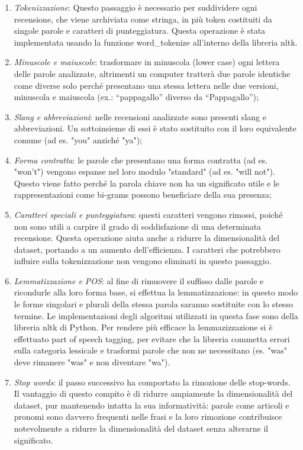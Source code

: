 \documentclass[fleqn,10pt]{SelfArx} %
\begin{document}
\begin{enumerate}
\item \textit{Tokenizzazione}: Questo passaggio è necessario per suddividere ogni recensione, che viene archiviata come stringa, in più token costituiti da singole parole e caratteri di punteggiatura. Questa operazione è stata implementata usando la funzione word\_tokenize all'interno della libreria nltk.

\item \textit{Minuscole e maiuscole}: trasformare in minuscola (lower case) ogni lettera delle parole analizzate, altrimenti un computer tratterà due parole identiche come diverse solo perché presentano una stessa lettera nelle due versioni, minuscola e maiuscola (ex.: “pappagallo” diverso da “Pappagallo”);

\item \textit{Slang e abbreviazioni}: nelle recensioni analizzate sono presenti slang e abbreviazioni. Un sottoinsieme di essi è stato sostituito con il loro equivalente comune (ad es. "you" anziché "ya");

\item \textit{Forma contratta}: le parole che presentano una forma contratta (ad es. "won’t") vengono espanse nel loro modulo "standard" (ad es. "will not"). Questo viene fatto perché la parola chiave non ha un significato utile e le rappresentazioni come bi-grams possono beneficiare della sua presenza;

\item \textit{Caratteri speciali e punteggiatura}: questi caratteri vengono rimossi, poiché non sono utili a carpire il grado di soddisfazione di una determinata recensione. Questa operazione aiuta anche a ridurre la dimensionalità del dataset, portando a un aumento dell'efficienza. I caratteri che potrebbero influire sulla tokenizzazione non vengono eliminati in questo passaggio.

\item \textit{Lemmatizzazione e POS}: al fine di rimuovere il suffisso dalle parole e ricondurle alla loro forma base, si effettua la lemmatizzazione: in questo modo le forme singolari e plurali della stessa parola saranno sostituite con lo stesso termine. Le implementazioni degli algoritmi utilizzati in questa fase sono della libreria nltk di Python. Per rendere più efficace la lemmazizzazione si è effettuato part of speech tagging, per evitare che la libreria commetta errori sulla categoria lessicale e trasformi parole che non ne necessitano (es. "was" deve rimanere "was" e non diventare "wa").

\item \textit{Stop words}: il passo successivo ha comportato la rimozione delle stop-words. Il vantaggio di questo compito è di ridurre ampiamente la dimensionalità del dataset, pur mantenendo intatta la sua informatività: parole come articoli e pronomi sono davvero frequenti nelle frasi e la loro rimozione contribuisce notevolmente a ridurre la dimensionalità del dataset senza alterarne il significato.

\end{enumerate}
\end{document}
